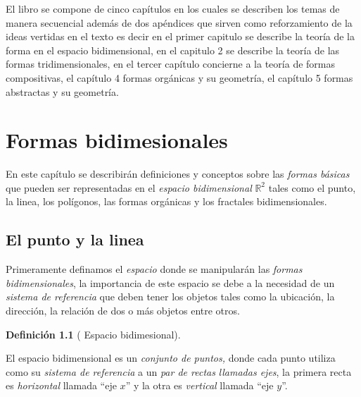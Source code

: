 \documentclass[16pt,]{krantz}
\theoremstyle{definition}
\newtheorem{definition}{Definición}[chapter]
\theoremstyle{definition}
\theoremstyle{definition}
\theoremstyle{definition}
\theoremstyle{remark}
\begin{document}
El libro se compone de cinco capítulos en los cuales se describen los temas de manera secuencial además de dos apéndices que sirven como reforzamiento de la ideas vertidas en el texto es decir en el primer capitulo se describe la teoría de la forma en el espacio bidimensional, en el capitulo 2 se describe la teoría de las formas tridimensionales, en el tercer capítulo concierne a la teoría de formas compositivas, el capítulo 4 formas orgánicas y su geometría, el capítulo 5 formas abstractas y su geometría.

\mainmatter

\hypertarget{formas-bidimesionales}{%
\chapter{Formas bidimesionales}\label{formas-bidimesionales}}

En este capítulo se describirán definiciones y conceptos sobre las \emph{formas básicas} que pueden ser representadas en el \emph{espacio bidimensional}  \(\mathbb{R}^2\) tales como el punto, la linea, los polígonos, las formas orgánicas y los fractales bidimensionales.

\hypertarget{el-punto-y-la-linea}{%
\section{El punto y la linea}\label{el-punto-y-la-linea}}

Primeramente definamos el \emph{espacio} donde se manipularán las \emph{formas bidimensionales}, la importancia de este espacio se debe a la necesidad de un \emph{sistema de referencia} que deben tener los objetos tales como la ubicación, la dirección, la relación de dos o más objetos entre otros.

\begin{definition}[ Espacio bidimesional]
\protect\hypertarget{def:r2}{}{\label{def:r2} {} }
\end{definition}

El espacio bidimensional  es un \emph{conjunto de puntos,}  donde cada punto utiliza como su \emph{sistema de referencia} a un \emph{par de rectas} \emph{llamadas ejes}, la primera recta es \emph{horizontal}  llamada ``eje \(x\)'' y la otra es \emph{vertical}  llamada ``eje \(y\)''.
\end{document}
